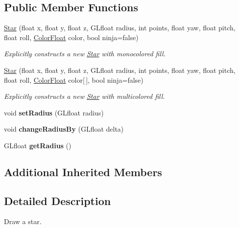 \subsection*{Public Member Functions}
\begin{DoxyCompactItemize}
\item 
\hyperlink{classtsgl_1_1_star_aab27c892812fbfdd38f6120e7fd51d54}{Star} (float x, float y, float z, G\+Lfloat radius, int points, float yaw, float pitch, float roll, \hyperlink{structtsgl_1_1_color_float}{Color\+Float} color, bool ninja=false)
\begin{DoxyCompactList}\small\item\em Explicitly constructs a new \hyperlink{classtsgl_1_1_star}{Star} with monocolored fill. \end{DoxyCompactList}\item 
\hyperlink{classtsgl_1_1_star_ab62504df43ed6dd1b0c17c7e599a2539}{Star} (float x, float y, float z, G\+Lfloat radius, int points, float yaw, float pitch, float roll, \hyperlink{structtsgl_1_1_color_float}{Color\+Float} color\mbox{[}$\,$\mbox{]}, bool ninja=false)
\begin{DoxyCompactList}\small\item\em Explicitly constructs a new \hyperlink{classtsgl_1_1_star}{Star} with multicolored fill. \end{DoxyCompactList}\item 
\mbox{\label{classtsgl_1_1_star_ab5a7c287238746307dbf27384fda787a}} 
void {\bfseries set\+Radius} (G\+Lfloat radius)
\item 
\mbox{\label{classtsgl_1_1_star_af42eb52015623b8f5a0e4d3742c44298}} 
void {\bfseries change\+Radius\+By} (G\+Lfloat delta)
\item 
\mbox{\label{classtsgl_1_1_star_abe53ad96ef2c48ddc596b9a4a8199cfd}} 
G\+Lfloat {\bfseries get\+Radius} ()
\end{DoxyCompactItemize}
\subsection*{Additional Inherited Members}


\subsection{Detailed Description}
Draw a star. 

